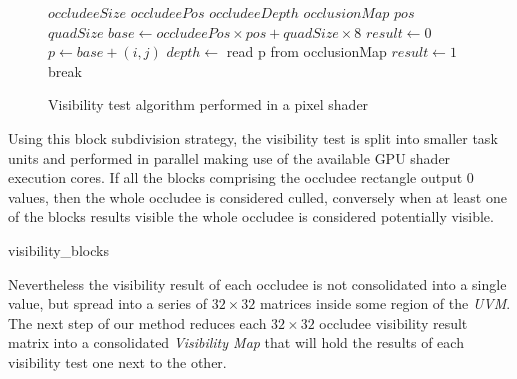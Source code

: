 \documentclass[10pt, conference]{IEEEtran}
\begin{document}
\begin{figure}[!hbp]
	
	\begin{algorithmic}[1]
		\REQUIRE $occludeeSize$
		\REQUIRE $occludeePos$ 
		\REQUIRE $occludeeDepth$
		\REQUIRE $occlusionMap$
		\REQUIRE $pos$ 
		\REQUIRE $quadSize$
		\STATE $base \leftarrow occludeePos \times pos + quadSize \times 8$
		\STATE $result \leftarrow 0$ 
				\STATE $p \leftarrow base + (i, j)$
				\STATE $depth \leftarrow$ read p from occlusionMap
					\STATE $result \leftarrow 1$ 
					\STATE break
				\ENDIF
			\ENDFOR
		\ENDFOR
	\end{algorithmic}
	\caption{Visibility test algorithm performed in a pixel shader}
	\label{algorithm8by8}
\end{figure}

Using this block subdivision strategy, the visibility test is split into smaller task units and performed in parallel making use of the available GPU shader execution cores. 
If all the blocks comprising the occludee rectangle output $0$ values, then the whole occludee is considered culled, conversely when at 
least one of the blocks results visible the whole occludee is considered potentially visible.\


{visibility_blocks}{
%
}




Nevertheless the visibility result of each occludee is not consolidated into a single value, but spread into a series of $32 \times 32$ matrices inside some region of the \emph{UVM}. 
The next step of our method reduces each $32 \times 32$ occludee visibility result matrix into a consolidated \emph{Visibility Map} that will hold the results of each visibility test one next to the other.\

\end{document}
